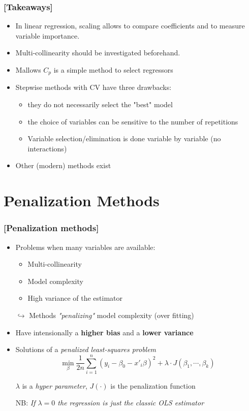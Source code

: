 \documentclass[xcolor=x11names,compress, handhouts]{beamer}
\renewcommand{\(}{\begin{columns}}
\renewcommand{\)}{\end{columns}}
\newcommand{\<}[1]{\begin{column}{#1}}
\renewcommand{\>}{\end{column}}
\begin{document}
\begin{frame} %
\frametitle{\textcolor{brique}{[Takeaways]}}
\begin{itemize}[<+->]
\item In linear regression, scaling allows to compare coefficients and to measure variable importance.
\item Multi-collinearity should be investigated beforehand.
\item Mallows $C_p$ is a simple method to select regressors
\item Stepwise methods with CV have three drawbacks:
    \begin{itemize}[<+->]
        \item they do not necessarily select the "best" model
        \item the choice of variables can be sensitive to the number of repetitions
        \item Variable selection/elimination is done variable by variable (no interactions)
    \end{itemize}
\item Other (modern) methods exist
\end{itemize}
\end{frame}


\section{Penalization Methods}


\begin{frame} %
\frametitle{\textcolor{brique}{[Penalization methods]}}
\pause
\begin{itemize}[<+->]
\item Problems when many variables are available:
 \begin{itemize}[<+->]
        \item Multi-collinearity
        \item Model complexity
        \item High variance of the estimator
    \end{itemize}
\item[$\hookrightarrow$]  Methods  \emph{"penalizing"} model complexity (over fitting)
\item Have intensionally a \textbf{higher bias} and a \textbf{lower variance}
\item Solutions of a \textit{ penalized least-squares problem}$$
\min_{\beta} \frac{1}{2n}
     \sum_{i=1}^{n}{ \left( y_i - \beta_0 - x'_i\beta\right)^{2} } +
\lambda \cdot J(\beta_1, \cdots, \beta_k)
$$
\item[] $\lambda$ is a \textit{hyper parameter}, $J(\cdot)$ is the penalization function
\item[NB:] \textit{If $\lambda = 0$ the regression is just the classic OLS estimator}
\end{itemize}
\end{frame}
\end{document}
